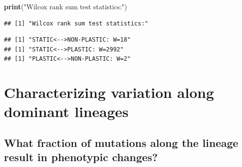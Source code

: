 \documentclass[]{book}
\newenvironment{Shaded}{\begin{snugshade}}{\end{snugshade}}
\newcommand{\ControlFlowTok}[1]{\textcolor[rgb]{0.13,0.29,0.53}{\textbf{#1}}}
\newcommand{\DataTypeTok}[1]{\textcolor[rgb]{0.13,0.29,0.53}{#1}}
\newcommand{\DecValTok}[1]{\textcolor[rgb]{0.00,0.00,0.81}{#1}}
\newcommand{\KeywordTok}[1]{\textcolor[rgb]{0.13,0.29,0.53}{\textbf{#1}}}
\newcommand{\NormalTok}[1]{#1}
\newcommand{\OperatorTok}[1]{\textcolor[rgb]{0.81,0.36,0.00}{\textbf{#1}}}
\newcommand{\OtherTok}[1]{\textcolor[rgb]{0.56,0.35,0.01}{#1}}
\newcommand{\StringTok}[1]{\textcolor[rgb]{0.31,0.60,0.02}{#1}}
\begin{document}
\begin{Shaded}
\begin{Highlighting}[]
\KeywordTok{print}\NormalTok{(}\StringTok{"Wilcox rank sum test statistics:"}\NormalTok{)}
\end{Highlighting}
\end{Shaded}

\begin{verbatim}
## [1] "Wilcox rank sum test statistics:"
\end{verbatim}

\begin{Shaded}
\end{Shaded}

\begin{verbatim}
## [1] "STATIC<-->NON-PLASTIC: W=18"
## [1] "STATIC<-->PLASTIC: W=2992"
## [1] "PLASTIC<-->NON-PLASTIC: W=2"
\end{verbatim}

\hypertarget{characterizing-variation-along-dominant-lineages}{%
\section{Characterizing variation along dominant lineages}\label{characterizing-variation-along-dominant-lineages}}

\hypertarget{what-fraction-of-mutations-along-the-lineage-result-in-phenotypic-changes}{%
\subsection{What fraction of mutations along the lineage result in phenotypic changes?}\label{what-fraction-of-mutations-along-the-lineage-result-in-phenotypic-changes}}
\end{document}
